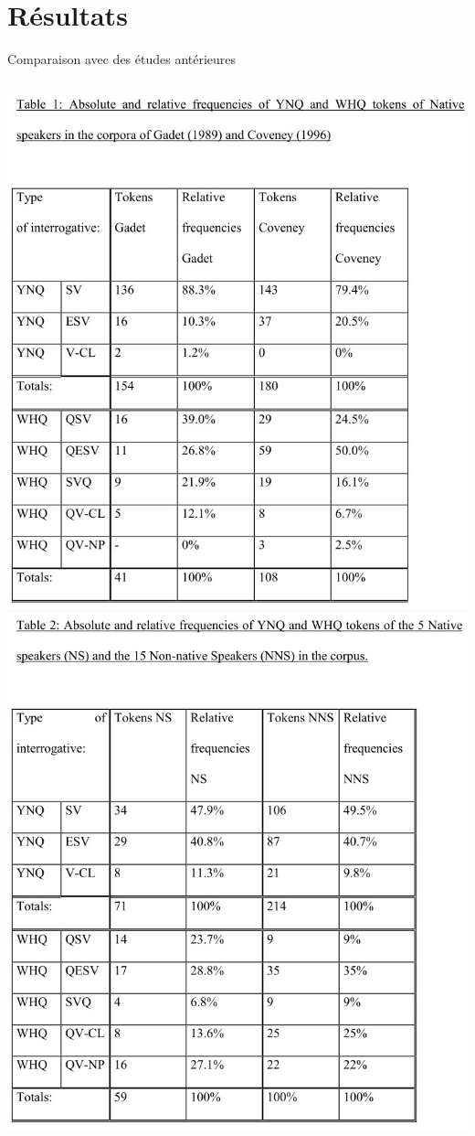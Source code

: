 \documentclass{beamer}
\begin{document}
  \section{Résultats}
    \begin{frame}[t]{Comparaison avec des études antérieures}
      \begin{columns}
          \includegraphics[scale=0.32]{gadet_coveney.jpg}
          \includegraphics[scale=0.32]{resultats.jpg}
      \end{columns}
    \end{frame}
\end{document}
